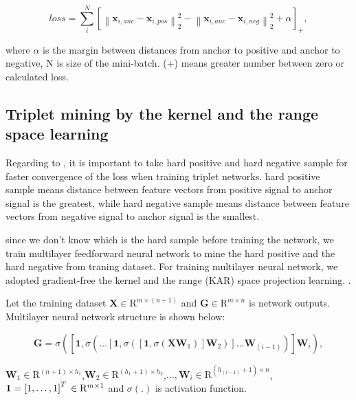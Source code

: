 \documentclass[runningheads]{llncs}
\begin{document}
\begin{equation}
    loss = \sum_i^N { \left[ {\left\| {{\mathbf{x}_{i,anc}} - {\mathbf{x}_{i,pos}}} \right\|_2^2} -
    {\left\| {{\mathbf{x}_{i,anc}} - {\mathbf{x}_{i,neg}}} \right\|_2^2}  + \alpha \right]_+},
\end{equation} 

where $\alpha$ is the margin between distances from anchor to positive and anchor to negative, N is size of the mini-batch. (+) means greater number between zero or calculated loss.


\subsection{Triplet mining by the kernel and the range space learning}

Regarding to \cite{schroff2015facenet}, it is important to take hard positive and hard negative sample for faster convergence of the loss when training triplet networks.
hard positive sample means distance between feature vectors from positive signal to anchor signal is the greatest, while hard negative sample means distance between feature vectors from negative signal to anchor signal is the smallest.

since we don't know which is the hard sample before training the network, we train multilayer feedforward neural network to mine the hard positive and the hard negative from traning dataset.
For training multilayer neural network, we adopted gradient-free the kernel and the range (KAR) space projection learning. \cite{toh2018learning,toh2018gradient}.

Let the training dataset $\mathbf{X}\in{\mathrm{R}}^{m \times (n+1)}$ and $\mathbf{G}\in{\mathrm{R}}^{m \times n}$ is network outputs.
Multilayer neural network structure is shown below:

\begin{equation}
    \mathbf{G} = \sigma\left(\left[\mathbf{1},\sigma\left(\dots\left[\mathbf{1},\sigma\left(\left[\mathbf{1},\sigma\left(\mathbf{X}\mathbf{W}_{1}\right)\right]\mathbf{W}_{2}\right)\right]\dots\mathbf{W}_{(i-1)}\right)\right]\mathbf{W}_{i}\right),
\end{equation}

$\mathbf{W}_{1}\in{\mathrm{R}}^{(n+1) \times h_{1}}$,$\mathbf{W}_{2}\in{\mathrm{R}}^{(h_{1}+1) \times h_{2}}$,$\dots,\mathbf{W}_{i}\in{\mathrm{R}}^{(h_{(i-1)}+1) \times n}$,$\mathbf{1}=\left[1,\dots,1\right]^{T}\\
\in{\mathrm{R}}^{m \times 1}$ and $\sigma(.)$ is activation function.
\end{document}
